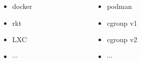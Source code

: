 \documentclass[usenames,dvipsnames, 18pt, compress, aspectratio=169]{beamer}
\begin{document}
\begin{frame}
    \frametitle{}
    \begin{columns}

        \begin{column}{0.15\columnwidth}
        \end{column}

        \begin{column}{0.35\columnwidth}
        \begin{itemize}[label={\MVRightarrow}]
            \item docker
            \item rkt
            \item LXC
            \item $\cdots$
        \end{itemize}
        \end{column}

        \begin{column}{0.48\columnwidth}
        \begin{itemize}[label={\MVRightarrow}]
            \item podman
            \item cgroup v1
            \item cgroup v2
            \item $\cdots$
        \end{itemize}
        \end{column}

    \end{columns}

\end{frame}
\end{document}

